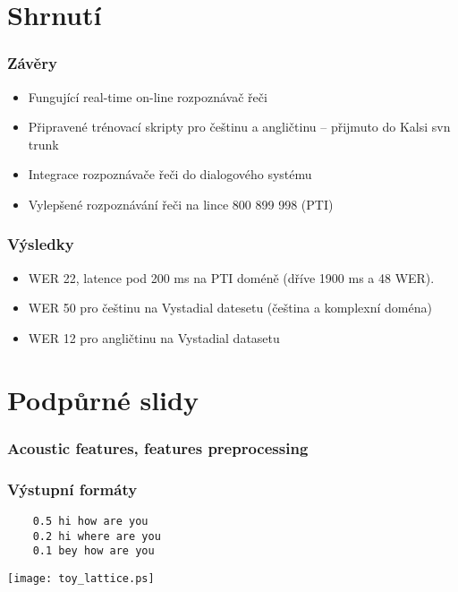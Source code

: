 \section{Shrnutí} %

\begin{frame}\frametitle{Závěry} 
    \begin{itemize}
        \item Fungující real-time on-line rozpoznávač řeči
        \item Připravené trénovací skripty pro češtinu a angličtinu -- přijmuto do Kalsi svn trunk
        \item Integrace rozpoznávače řeči do dialogového systému
        \item Vylepšené rozpoznávání řeči na lince 800 899 998 (PTI)
    \end{itemize}
\end{frame}

\begin{frame}\frametitle{Výsledky} 
    \begin{itemize}
        \item WER 22, latence pod 200 ms na PTI doméně (dříve 1900 ms a 48 WER). 
        \item WER 50 pro češtinu na Vystadial datesetu (čeština a komplexní doména)
        \item WER 12 pro angličtinu na Vystadial datasetu 
    \end{itemize}
\end{frame}


\section{Podpůrné slidy} %

\begin{frame}\frametitle{Acoustic features, features preprocessing} 
    
    
\end{frame}

\begin{frame}[fragile]\frametitle{Výstupní formáty} 

    \begin{verbatim}
    0.5 hi how are you
    0.2 hi where are you
    0.1 bey how are you
\end{verbatim}

    \begin{center}
        \texttt{[image: toy\_lattice.ps]}
    \end{center}
\end{frame}


